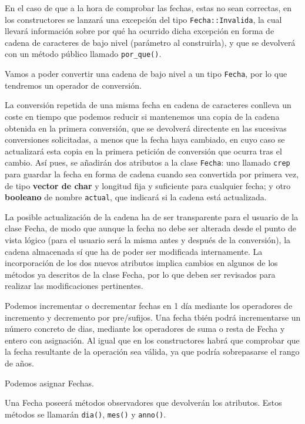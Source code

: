 En el caso de que a la hora de comprobar las fechas, estas no sean correctas, en los constructores se lanzará una excepción
del tipo \texttt{Fecha::Invalida}, la cual llevará información sobre por qué ha ocurrido dicha excepción en
forma de cadena de caracteres de bajo nivel (parámetro al construirla), 
y que se devolverá con un método público llamado \texttt{por\_que()}.

Vamos a poder convertir una cadena de bajo nivel a un tipo \texttt{Fecha}, por lo que tendremos
un operador de conversión.

La conversión repetida de una misma fecha en cadena de caracteres conlleva un coste
en tiempo que podemos reducir si mantenemos una copia de la cadena obtenida en la
primera conversión, que se devolverá directente en las sucesivas conversiones 
solicitadas, a menos que la fecha haya cambiado, en cuyo caso se actualizará esta
copia en la primera petición de conversión que ocurra tras el cambio. Así pues, 
se añadirán dos atributos a la clase \texttt{Fecha}: uno llamado \texttt{crep} para guardar la 
fecha en forma de cadena cuando sea convertida por primera vez, de tipo \textbf{vector 
de char} y longitud fija y suficiente para cualquier fecha; y otro \textbf{booleano} de
nombre \texttt{actual}, que indicará si la cadena está actualizada. 

La posible actualización de la cadena ha de ser transparente para el usuario 
de la clase Fecha, de modo que aunque la fecha no debe ser alterada desde el 
punto de vista lógico (para el usuario será la misma antes y después de la 
conversión), la cadena almacenada sí que ha de poder ser modificada internamente.
La incorporación de los dos nuevos atributos implica cambios en algunos de los 
métodos ya descritos de la clase Fecha, por lo que deben ser revisados para 
realizar las modificaciones pertinentes.

Podemos incrementar o decrementar fechas en 1 día mediante los operadores de incremento y decremento
por pre/sufijos. Una fecha tbién podrá incrementarse un número concreto de dias, mediante los
operadores de suma o resta de Fecha y entero con asignación.
Al igual que en los constructores habrá que comprobar que la fecha resultante de la
operación sea válida, ya que podría sobrepasarse el rango de años. 

Podemos asignar Fechas.

Una Fecha poseerá métodos observadores que devolverán los atributos. 
Estos métodos se llamarán \texttt{dia()}, \texttt{mes()} y \texttt{anno()}.

